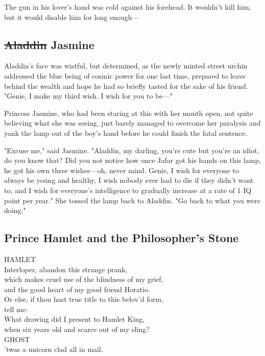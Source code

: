 The gun in his lover's hand was cold against his forehead. It wouldn't kill
him, but it would disable him for long enough—
\sbreak
\vspace{-2\baselineskip}
\subsection{\sout{Aladdin} Jasmine}
Aladdin's face was wistful, but determined, as the newly minted street urchin
addressed the blue being of cosmic power for one last time, prepared to leave
behind the wealth and hope he had so briefly tasted for the sake of his friend.
"Genie, I make my third wish. I wish for you to be—"

Princess Jasmine, who had been staring at this with her mouth open, not quite
believing what she was seeing, just barely managed to overcome her paralysis
and yank the lamp out of the boy's hand before he could finish the fatal
sentence.

"Excuse me," said Jasmine. "Aladdin, my darling, you're cute but you're an
idiot, do you know that? Did you not notice how once Jafar got his hands on
this lamp, he got his own three wishes—oh, never mind. Genie, I wish for
everyone to always be young and healthy, I wish nobody ever had to die if they
didn't want to, and I wish for everyone's intelligence to gradually increase at
a rate of 1 IQ point per year." She tossed the lamp back to Aladdin. "Go back
to what you were doing."
\sbreak
\vspace{-2\baselineskip}
\subsection{Prince Hamlet and the Philosopher's Stone}
\noindent{}HAMLET\\
Interloper, abandon this strange prank,\\
which makes cruel use of the blindness of my grief,\\
and the good heart of my good friend Horatio.\\
Or else, if thou hast true title to this belov'd form,\\
tell me:\\
What drawing did I present to Hamlet King,\\
when six years old and scarce out of my sling?\\

\noindent{}GHOST\\
'twas a unicorn clad all in mail.\\


